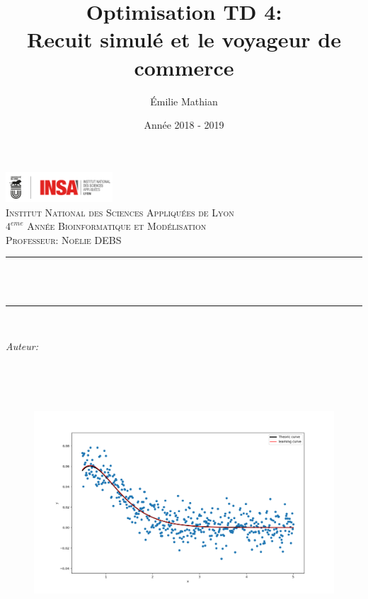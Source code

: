 \documentclass[12pt]{article}
\title{\color{brick} Optimisation TD 4:\\
\LARGE{Recuit simulé et le voyageur de commerce}}								%
\author{Émilie Mathian}								%
\date{Année 2018 - 2019}											%
\makeatletter
\let\thetitle\@title
\let\theauthor\@author
\let\thedate\@date
\makeatother
\begin{document}

\begin{titlepage}
	\centering
    \vspace*{0.5 cm}
    \vspace{-3.5cm}
    \includegraphics[width = 4cm]{logo.png}\\	%
    \textsc{\LARGE Institut National des Sciences Appliquées de Lyon}\\[2.0 cm]	%
	\textsc{\Large $4^{eme}$ Année Bioinformatique et Modélisation}\\[0.5 cm]				%
	\textsc{\large Professeur: Noëlie DEBS }\\[0.5 cm]				%
	\rule{\linewidth}{0.2 mm} \\[0.4 cm]
	{ \huge \bfseries \thetitle}\\
	\rule{\linewidth}{0.2 mm} \\[1.5 cm]
	
	\begin{minipage}{0.4\textwidth}
		\begin{flushleft} \large
			\emph{Auteur:}
			\theauthor
			\end{flushleft}
			\end{minipage}~
			\begin{minipage}{0.4\textwidth}	
	\end{minipage}\\[2 cm]
    \vspace{-1.8cm}
	 \begin{figure}[H]
	\begin{center}
	\includegraphics[width=0.9 \textwidth]{Figure_1.png}
\end{center}
\end{figure}

	{\large \thedate}\\[1 cm]
    
	\vfill

 

\end{titlepage}
\pagebreak
\end{document}
